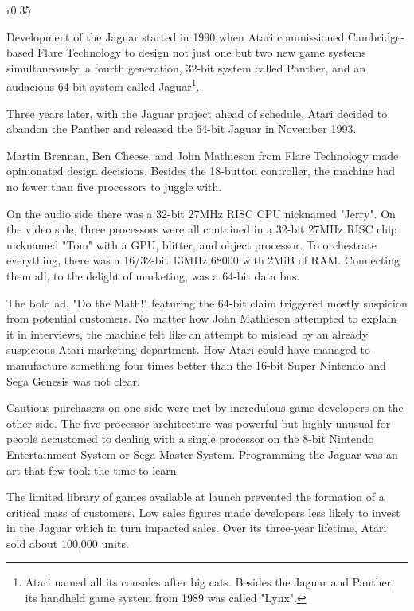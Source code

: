 \begin{wrapfigure}[5]{r}{0.35\textwidth}{
\centering {}}
\end{wrapfigure}
Development of the Jaguar started in 1990 when Atari commissioned Cambridge-based Flare Technology to design not just one but two new game systems simultaneously: a fourth generation, 32-bit system called Panther, and an audacious 64-bit system called Jaguar\footnote{Atari named all its consoles after big cats. Besides the Jaguar and Panther, its handheld game system from 1989 was called "Lynx".}.
\par Three years later, with the Jaguar project ahead of schedule, Atari decided to abandon the Panther and released the 64-bit Jaguar in November 1993.\\
\par
{}
\par
Martin Brennan, Ben Cheese, and John Mathieson from Flare Technology made opinionated design decisions. Besides the 18-button controller, the machine had no fewer than five processors to juggle with.\\
\par
On the audio side there was a 32-bit 27MHz RISC CPU nicknamed "Jerry". On the video side, three processors were all contained in a 32-bit 27MHz RISC chip nicknamed "Tom" with a GPU, blitter, and object processor. To orchestrate everything, there was a 16/32-bit 13MHz 68000 with 2MiB of RAM. Connecting them all, to the delight of marketing, was a 64-bit data bus.\\
\par
The bold ad, "Do the Math!" featuring the 64-bit claim triggered mostly suspicion from potential customers.  No matter how John Mathieson attempted to explain it in interviews, the machine felt like an attempt to mislead by an already suspicious Atari marketing department. How Atari could have managed to manufacture something four times better than the 16-bit Super Nintendo and Sega Genesis was not clear.
\par
Cautious purchasers on one side were met by incredulous game developers on the other side. The five-processor architecture was powerful but highly unusual for people accustomed to dealing with a single processor on the 8-bit Nintendo Entertainment System or Sega Master System. Programming the Jaguar was an art that few took the time to learn.\\
\par
The limited library of games available at launch prevented the formation of a critical mass of customers. Low sales figures made developers less likely to invest in the Jaguar which in turn impacted sales. Over its three-year lifetime, Atari sold about 100,000 units. 


